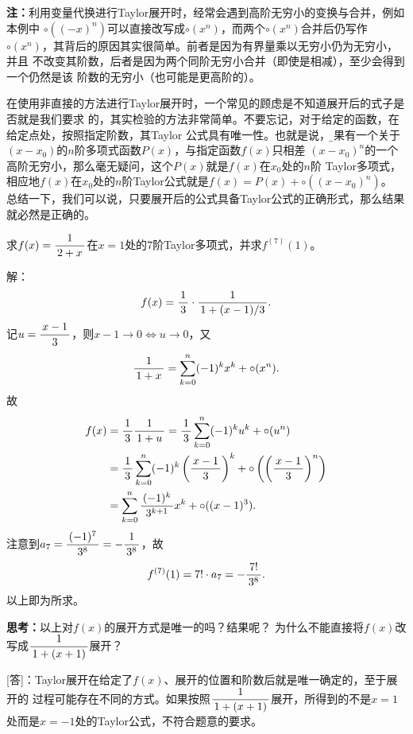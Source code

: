 {\bf 注：}利用变量代换进行Taylor展开时，经常会遇到高阶无穷小的变换与合并，例如本例中
$\circ((-x)^n)$可以直接改写成$\circ(x^n)$，而两个$\circ(x^n)$合并后仍写作
$\circ(x^n)$，其背后的原因其实很简单。前者是因为有界量乘以无穷小仍为无穷小，并且
不改变其阶数，后者是因为两个同阶无穷小合并（即使是相减），至少会得到一个仍然是该
阶数的无穷小（也可能是更高阶的）。

在使用非直接的方法进行Taylor展开时，一个常见的顾虑是不知道展开后的式子是否就是我们要求
的，其实检验的方法非常简单。不要忘记，对于给定的函数，在给定点处，按照指定阶数，其Taylor
公式具有唯一性。也就是说，{\b 如果有一个关于$(x-x_0)$的$n$阶多项式函数$P(x)$，与指定函数$f(x)$只相差
$(x-x_0)^n$的一个高阶无穷小，那么毫无疑问，这个$P(x)$就是$f(x)$在$x_0$处的$n$阶
Taylor多项式，相应地$f(x)$在$x_0$处的$n$阶Taylor公式就是$f(x)=P(x)+\circ((x-x_0)^n)$。
总结一下，我们可以说，只要展开后的公式具备Taylor公式的正确形式，那么结果就必然是正确的。}

\egz 求$f(x)=\displaystyle\frac{\,{1}\,}{\,{2+x}\,}$在$x=1$处的$7$阶Taylor多项式，并求$f^{(7)}(1)$。

解：
$$f(x)=\displaystyle\frac{\,{1}\,}{\,{3}\,}\cdot\displaystyle\frac{\,{1}\,}{\,{1+(x-1)/3}\,}.$$
记$u=\displaystyle\frac{\,{x-1}\,}{\,{3}\,}$，则$x-1\to0\Leftrightarrow u\to0$，又
$$\displaystyle\frac{\,{1}\,}{\,{1+x}\,}=\sum\limits_{k=0}^n(-1)^kx^k+\circ(x^n).$$
故
\begin{align*}
	f(x)&=\displaystyle\frac{\,{1}\,}{\,{3}\,}\displaystyle\frac{\,{1}\,}{\,{1+u}\,}
	=\displaystyle\frac{\,{1}\,}{\,{3}\,}\sum\limits_{k=0}^n(-1)^ku^k+\circ(u^n)\\
	&=\displaystyle\frac{\,{1}\,}{\,{3}\,}\sum\limits_{k=0}^n(-1)^k\left(\displaystyle\frac{\,{x-1}\,}{\,{3}\,}\right)^k
	+\circ\left(\left(\displaystyle\frac{\,{x-1}\,}{\,{3}\,}\right)^n\right)\\
	&=\sum\limits_{k=0}^n\displaystyle\frac{\,{(-1)^k}\,}{\,{3^{k+1}}\,}x^k
	+\circ((x-1)^3).
\end{align*}
注意到$a_7=\displaystyle\frac{\,{(-1)^7}\,}{\,{3^8}\,}=-\displaystyle\frac{\,{1}\,}{\,{3^8}\,}$，故
$$f^{(7)}(1)=7!\cdot a_7=-\displaystyle\frac{\,{7!}\,}{\,{3^8}\,}.$$
以上即为所求。\fin

{\bf 思考：}以上对$f(x)$的展开方式是唯一的吗？结果呢？
为什么不能直接将$f(x)$改写成$\displaystyle\frac{\,{1}\,}{\,{1+(x+1)}\,}$展开？

[答]：Taylor展开在给定了$f(x)$、展开的位置和阶数后就是唯一确定的，至于展开的
过程可能存在不同的方式。如果按照$\displaystyle\frac{\,{1}\,}{\,{1+(x+1)}\,}$展开，所得到的不是$x=1$
处而是$x=-1$处的Taylor公式，不符合题意的要求。

